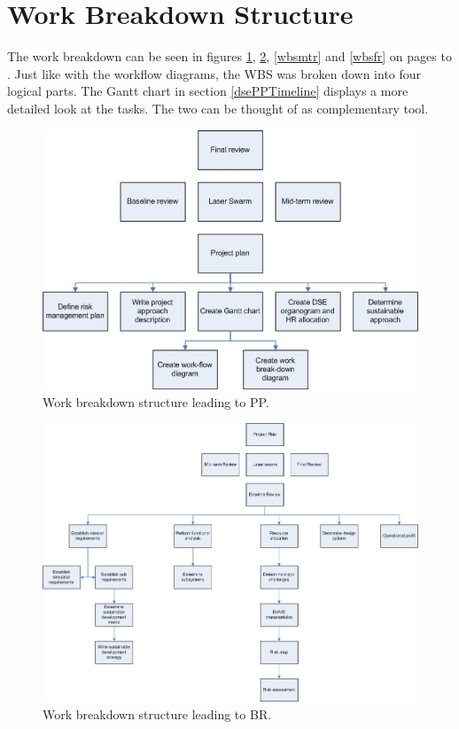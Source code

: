 \section{Work Breakdown Structure}
\label{dsePPWBS}
The work breakdown can be seen in figures \ref{wbspp}, \ref{wbsbr}, \ref{wbsmtr} and \ref{wbsfr} on pages \pageref{wbspp} to \pageref{wbsfr}. Just like with the workflow diagrams, the WBS was broken down into four logical parts. The Gantt chart in section \ref{dsePPTimeline} displays a more detailed look at the tasks. The two can be thought of as complementary tool.

\begin{figure} [H]
\begin{center}
\includegraphics[width=1.0\textwidth, angle=0]{chapters/img/Work_break_down_structure_PP.jpg}
\end{center}
\caption{Work breakdown structure leading to PP.}
\label{wbspp}
\end{figure}
\begin{figure} [H]
\begin{center}
\includegraphics[width=1.0\textwidth, angle=0]{chapters/img/Work_break_down_structure_BR.jpg}
\end{center}
\caption{Work breakdown structure leading to BR.}
\label{wbsbr}
\end{figure}
